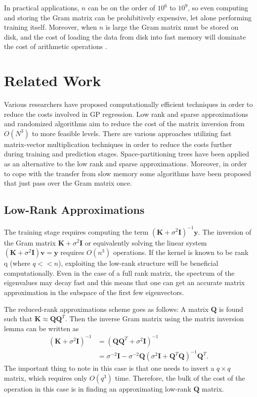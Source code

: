 \documentclass{article}
\begin{document}
In practical applications, $n$ can be on the order of $10^6$ to $10^9$, so even computing and storing the Gram matrix can be prohibitively expensive, let alone performing training itself. Moreover, when $n$ is large the Gram matrix must be stored on disk, and the cost of loading the data from disk into fast memory will dominate the cost of arithmetic operations \cite{RandomizedMatrixDecompose}. 

\section{Related Work}

Various researchers have proposed computationally efficient techniques in order to reduce the costs involved in GP regression. Low rank and sparse approximations and randomized algorithms aim to reduce the cost of the matrix inversion from $O(N^3)$ to more feasible levels. There are various approaches utilizing fast matrix-vector multiplication techniques in order to reduce the costs further during training and prediction stages. Space-partitioning trees have been applied as an alternative to the low rank and sparse approximations. Moreover, in order to cope with the transfer from slow memory some algorithms have been proposed that just pass over the Gram matrix once.

\subsection{Low-Rank Approximations}
The training stage requires computing the term $(\mathbf{K}+\sigma^2\mathbf{I})^{-1}\mathbf{y}$. The inversion of the Gram matrix $\mathbf{K}+\sigma^2\mathbf{I}$ or equivalently solving the linear system $(\mathbf{K}+\sigma^2\mathbf{I})\mathbf{v}=\mathbf{y}$ requires $O(n^3)$ operations. If the kernel is known to be rank q (where $q<<n$), exploiting the low-rank structure will be beneficial computationally. Even in the case of a full rank matrix, the spectrum of the eigenvalues may decay fast and this means that one can get an accurate matrix approximation in the subspace of the first few eigenvectors. 

The reduced-rank approximations scheme goes as follows: A matrix $\mathbf{Q}$ is found such that $\mathbf{K} \approx \mathbf{Q}\mathbf{Q}^T$. Then the inverse Gram matrix using the matrix inversion lemma can be written as
\begin{align}
(\mathbf{K}+\sigma^2\mathbf{I})^{-1}&=(\mathbf{Q}\mathbf{Q}^T+\sigma^2\mathbf{I})^{-1} \nonumber \\
&=\sigma^{-2}\mathbf{I}-\sigma^{-2}\mathbf{Q}(\sigma^2\mathbf{I}+\mathbf{Q}^T\mathbf{Q})^{-1}\mathbf{Q}^T.
\end{align}
The important thing to note in this case is that one needs to invert a $q \times q$ matrix, which requires only $O(q^3)$ time. Therefore, the bulk of the cost of the operation in this case is in finding an approximating low-rank $\mathbf{Q}$ matrix.
\end{document}
